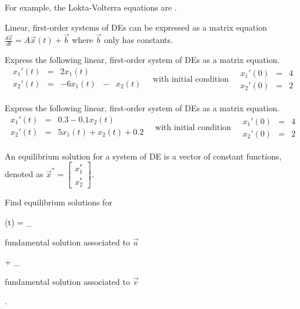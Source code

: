 \documentclass[../main.tex]{subfiles}
\begin{document}
For example, the Lokta-Volterra equations are \underline{\hspace{3in}}.
\clearpage

Linear, first-order systems of DEs can be expressed as a matrix equation \(\frac{d \vec{x}}{dt} = A \vec{x}(t) + \vec{b}\) where \(\vec{b}\) only has constants.

\begin{example}
  Express the following linear, first-order system of DEs as a matrix equation.
  \[
     \begin{array}{rcrcr}
      x_{1}'(t) &=&  2 x_{1}(t) \\
      x_{2}'(t) &=& -6 x_{1}(t) &-& x_{2}(t) \\
     \end{array}
     \quad\text{with initial condition}\quad
     \begin{array}{rcr}
      x_{1}'(0) &=& 4 \\
      x_{2}'(0) &=& 2
     \end{array}
  \]

\end{example}

\begin{example}
  Express the following linear, first-order system of DEs as a matrix equation.
  \[
     \begin{array}{rcl}
       x_{1}'(t) &=& 0.3 - 0.1 x_{2}(t) \\
       x_{2}'(t) &=&   5 x_{1}(t) + x_{2}(t) + 0.2 \\
     \end{array}
     \quad\text{with initial condition}\quad
     \begin{array}{rcr}
      x_{1}'(0) &=& 4 \\
      x_{2}'(0) &=& 2
     \end{array}
  \]

\end{example}

An equilibrium solution for a system of DE is a vector of constant functions, denoted as \(\vec{x}^{*} = \begin{bmatrix} x_{1}^{*} \\ x_{2}^{*} \end{bmatrix}\).
\begin{example}
  Find equilibrium solutions for 
\end{example}

  (t) = \hlsupp{\alpha} \cdot {}_{ \parbox[c]{1.6in}{\centering fundamental solution associated to \(\vec{u}\)}  } + \hlsupp{\beta} \cdot {}_{ \parbox[c]{1.6in}{\centering fundamental solution associated to \(\vec{v}\)} }.
\end{document}
